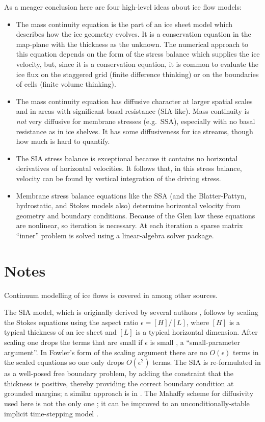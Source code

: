 \documentclass[letterpaper,final,12pt,reqno]{amsart}
\newcommand{\eps}{\epsilon}
\begin{document}
As a meager conclusion here are four high-level ideas about ice flow models:
\begin{itemize}
\item The mass continuity equation is the part of an ice sheet model which describes how the ice geometry evolves.  It is a conservation equation in the map-plane with the thickness as the unknown.   The numerical approach to this equation depends on the form of the stress balance which supplies the ice velocity, but, since it is a conservation equation, it is common to evaluate the ice flux on the staggered grid (finite difference thinking) or on the boundaries of cells (finite volume thinking).
\item The mass continuity equation has diffusive character at larger spatial scales and in areas with significant basal resistance (SIA-like).  Mass continuity is \emph{not} very diffusive for membrane stresses (e.g.~SSA), especially with no basal resistance as in ice shelves.  It has some diffusiveness for ice streams, though how much is hard to quantify.
\item The SIA stress balance is exceptional because it contains no horizontal derivatives of horizontal velocities.  It follows that, in this stress balance, velocity can be found by vertical integration of the driving stress.
\item Membrane stress balance equations like the SSA (and the Blatter-Pattyn, hydrostatic, and Stokes models also) determine horizontal velocity from geometry and boundary conditions.  Because of the Glen law these equations are nonlinear, so iteration is necessary.  At each iteration a sparse matrix ``inner'' problem is solved using a linear-algebra solver package.
\end{itemize}


\section{Notes} \label{sec:nr}

Continuum modelling of ice flows is covered in \cite{CuffeyPaterson,GreveBlatter2009,SchoofHewitt2013,vanderVeen} among other sources.

The SIA model, which is originally derived by several authors \cite{FowlerLarson1978,Hutter,MorlandJohnson}, follows by scaling the Stokes equations using the aspect ratio $\eps = [H]/[L]$, where $[H]$ is a typical thickness of an ice sheet and $[L]$ is a typical horizontal dimension.  After scaling one drops the terms that are small if $\eps$ is small \cite{Fowler,Hutter}, a ``small-parameter argument''.  In Fowler's form of the scaling argument \cite{Fowler} there are no $O(\eps)$ terms in the scaled equations so one only drops $O(\eps^2)$ terms.  The SIA is re-formulated in \cite{JouvetBueler2012} as a well-posed free boundary problem, by adding the constraint that the thickness is positive, thereby providing the correct boundary condition at grounded margins; a similar approach is in \cite{Bueler2016}.  The Mahaffy \cite{Mahaffy} scheme for diffusivity used here is not the only one \cite{HindmarshPayne}; it can be improved to an unconditionally-stable implicit time-stepping model \cite{Bueler2016}.
\end{document}
